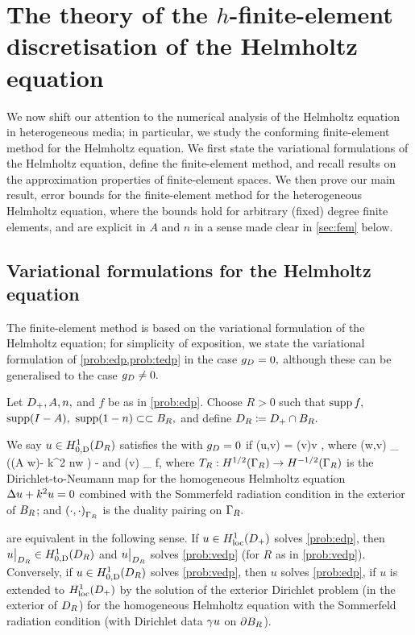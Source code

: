 \section[FE Theory for the Helmholtz Equation]{The theory of the $h$-finite-element dis\-cret\-i\-sa\-tion of the Helmholtz equation}\label{sec:helmfe}

We now shift our attention to the numerical analysis of the Helmholtz equation in heterogeneous media; in particular, we  study the conforming finite-element method for the Helmholtz equation. We first state the variational formulations of the Helmholtz equation, define the finite-element method, and recall results on the approximation properties of finite-element spaces. We then prove our main result, error bounds for the finite-element method for the heterogeneous Helmholtz equation, where the bounds hold for arbitrary (fixed) degree finite elements, and are explicit in $A$ and $n$ in a sense made clear in \cref{sec:fem} below.

  \subsection{Variational formulations for the Helmholtz equation}\label{sec:varform}
  The finite-element method is based on the variational formulation of the Helmholtz equation; for simplicity of exposition, we state the variational formulation of \cref{prob:edp,prob:tedp} in the case $g_{D} = 0,$ although these can be generalised to the case $g_{D} \neq 0.$
  
\bprob[Variational formulation of EDP when $\gD = 0$]\label{prob:vedp}
Let $D_{+}, A, n,$ and $f$ be as in \cref{prob:edp}. Choose $R>0$ such that $\operatorname{supp} f,$ $\operatorname{supp}(I-A),$ $\operatorname{supp}(1-n) \subset\subset B_{R},$ and define $D_{R} \coloneqq D_{+} \cap B_{R}.$

We say $u \in \HozDDR$ satisfies the  with $\gD = 0$ if
\beqs
\aE(u,v) = \FE(v)\quad \tfa v \in \HozDDR,
\eeqs
where
\beq\label{eq:aedp}
\aE(w,v) \de \int_{\DR} \mleft(\mleft(A \grad w\mright)\cdot\grad \vbar - k^2 n\minispace w \vbar\mright) - 
\eeq
and
\beq\label{eq:Ledp}
\FE(v) \de \int_{\DR} f\minispace\vbar,
\eeq
where $\DtN:\HhGR\rightarrow \HmhGR$ is the Dirichlet-to-Neumann map for the homogeneous Helmholtz equation $\Delta u + k^2 u = 0$ combined with the Sommerfeld radiation condition in the exterior of $B_{R}$; and $\DPGR{\cdot}{\cdot}$ is the duality pairing on $\Gamma_{R}.$
\eprob

\label{lem:edpform}
 are equivalent in the following sense. If $u \in \HolocDp$ solves \cref{prob:edp}, then $u\restrict_{\DR} \in \HozDDR$ and $u\big|_{D_{R}}$ solves \cref{prob:vedp}  (for $R$ as in \cref{prob:vedp}). Conversely, if $u \in \HozDDR$ solves \cref{prob:vedp}, then $u$ solves \cref{prob:edp}, if $u$ is extended to $\HolocDp$ by the solution of the exterior Dirichlet problem (in the exterior of $D_{R}$) for the homogeneous Helmholtz equation with the Sommerfeld radiation condition (with Dirichlet data $\gamma u$ on $\partial B_{R}$).
\ele

